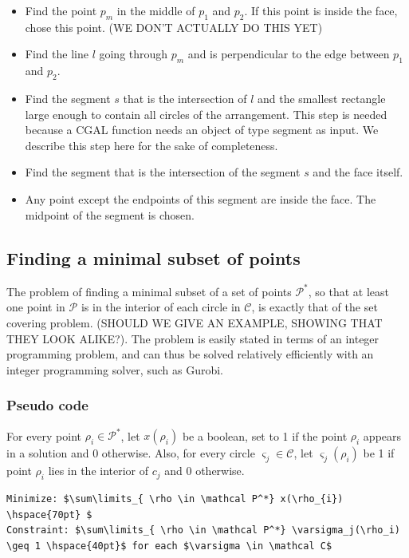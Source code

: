 \documentclass[a4paper,12pt]{article}
\begin{document}
\begin {itemize}
\item
Find the point $p_m$ in the middle of $p_1$ and $p_2$. If this point is inside the face, chose this point. (WE DON'T ACTUALLY DO THIS YET)
\item
Find the line $l$ going through $p_m$ and is perpendicular to the edge between $p_1$ and $p_2$.
\item
Find the segment $s$ that is the intersection of $l$ and the smallest rectangle large enough to contain all circles of the arrangement. This step is needed because a CGAL function needs an object of type segment as input. We describe this step here for the sake of completeness.
\item
Find the segment that is the intersection of the segment $s$ and the face itself.
\item
Any point except the endpoints of this segment are inside the face. The midpoint of the segment is chosen.
\end{itemize}

\subsection{Finding a minimal subset of points}
The problem of finding a minimal subset of a set of points $\mathcal P^*$, so that at least one point in $\mathcal P$ is in the interior of each circle in $\mathcal C$, is exactly that of the set covering problem. (SHOULD WE GIVE AN EXAMPLE, SHOWING THAT THEY LOOK ALIKE?). The problem is easily stated in terms of an integer programming problem, and can thus be solved relatively efficiently with an integer programming solver, such as Gurobi.
\subsubsection{Pseudo code }
For every point $\rho_i \in \mathcal P^*$, let $x(\rho_i)$ be a boolean, set to 1 if the point $\rho_i$ appears in a solution and 0 otherwise. Also, for every circle $\varsigma_j \in \mathcal C$, let $\varsigma_j (\rho_i)$ be 1 if point $\rho_i$ lies in the interior of $c_j$ and 0 otherwise.



\begin{lstlisting}[mathescape]
Minimize: $\sum\limits_{ \rho \in \mathcal P^*} x(\rho_{i}) \hspace{70pt} $
Constraint: $\sum\limits_{ \rho \in \mathcal P^*} \varsigma_j(\rho_i) \geq 1 \hspace{40pt}$ for each $\varsigma \in \mathcal C$
\end{lstlisting}
\end{document}
